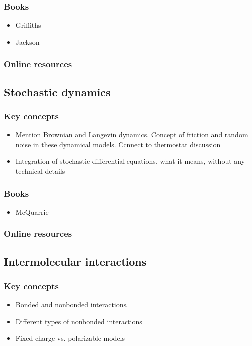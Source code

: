 \documentclass[9pt,bestpractices]{livecoms}
\begin{document}



\subsubsection{Books}
\begin{itemize}
\item Griffiths
\item Jackson
\end{itemize}
\subsubsection{Online resources}

\subsection{Stochastic dynamics}
\subsubsection{Key concepts}
\begin{itemize}
\item Mention Brownian and Langevin dynamics. Concept of friction and random noise in these dynamical models. Connect to thermostat discussion
\item Integration of stochastic differential equations, what it means, without any technical details
\end{itemize}
\subsubsection{Books}
\begin{itemize}
\item McQuarrie
\end{itemize}
\subsubsection{Online resources}

\subsection{Intermolecular interactions}
\subsubsection{Key concepts}
\begin{itemize}
\item Bonded and nonbonded interactions. 
\item Different types of nonbonded interactions
\item Fixed charge vs. polarizable models
\end{itemize}
\end{document}
